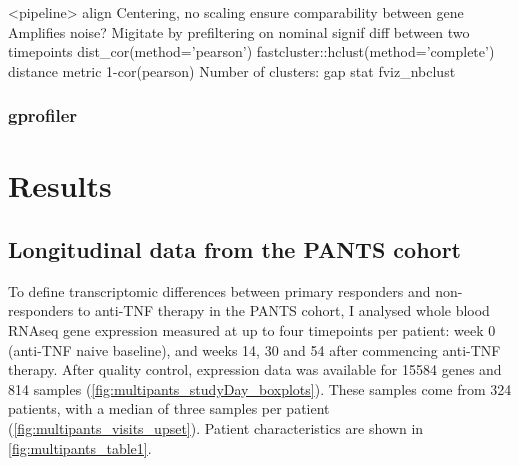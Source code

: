 \begin{outline}
\1 <pipeline>
    \2 align
    \2 Centering, no scaling
        \3 ensure comparability between gene
        \3 Amplifies noise? Migitate by prefiltering on nominal signif diff between two timepoints
    \2 dist\_cor(method='pearson')
    \2 fastcluster::hclust(method='complete')
    \2 distance metric 1-cor(pearson)
    \2 Number of clusters: gap stat fviz\_nbclust

\subsubsection{gprofiler}

\section{Results}

\subsection{Longitudinal  data from the \gls{PANTS} cohort}

To define transcriptomic differences between primary responders and non-responders to \gls{anti-TNF} therapy in the \gls{PANTS} cohort, 
I analysed whole blood \gls{RNAseq} gene expression measured at up to four timepoints per patient:
week 0 (\gls{anti-TNF} naive baseline), and weeks 14, 30 and 54 after commencing \gls{anti-TNF} therapy.
After quality control, expression data was available for 15584 genes and 814 samples (\autoref{fig:multipants_studyDay_boxplots}).
These samples come from 324 patients, with a median of three samples per patient (\autoref{fig:multipants_visits_upset}).
Patient characteristics are shown in \autoref{fig:multipants_table1}. 


\end{outline}
